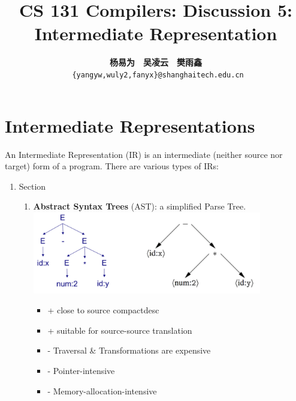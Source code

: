\documentclass[a4paper]{exam}
\title{CS 131 Compilers: Discussion 5: Intermediate Representation}
\author{\textbf{杨易为}~~\textbf{吴凌云}~~\textbf{樊雨鑫} \\ \texttt{ \{yangyw,wuly2,fanyx\}@shanghaitech.edu.cn}}
\theoremstyle{definition}
\begin{document}
\maketitle
\section{Intermediate Representations}
An Intermediate Representation (IR) is an intermediate (neither source nor target) form of a program. There are various types of IRs:
\begin{enumerate}
  \item Section
        \begin{enumerate}
          \item \textbf{Abstract Syntax Trees} (AST): a simplified Parse Tree.\\
                \includegraphics[width=10cm]{img/ast.png}
                \begin{itemize}
                  \item + close to source compactdesc
                  \item + suitable for source-source translation
                  \item - Traversal \& Transformations are expensive
                  \item - Pointer-intensive
                  \item - Memory-allocation-intensive
                \end{itemize}


\end{enumerate}
\end{enumerate}
\end{document}
